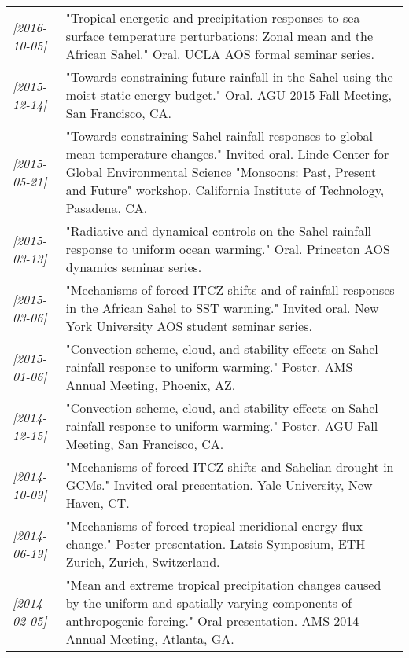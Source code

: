 \documentclass[12pt,letterpaper]{shillcv}
\begin{document}
\begin{center}
\begin{tabularx}{\textwidth}{lX}
\textit{[2016-10-05]} & "Tropical energetic and precipitation responses to sea surface temperature perturbations: Zonal mean and the African Sahel."  Oral.  UCLA AOS formal seminar series.\\
\textit{[2015-12-14]} & "Towards constraining future rainfall in the Sahel using the moist static energy budget." Oral.  AGU 2015 Fall Meeting, San Francisco, CA.\\
\textit{[2015-05-21]} & "Towards constraining Sahel rainfall responses to global mean temperature changes."  Invited oral.  Linde Center for Global Environmental Science "Monsoons: Past, Present and Future" workshop, California Institute of Technology, Pasadena, CA.\\
\textit{[2015-03-13]} & "Radiative and dynamical controls on the Sahel rainfall response to uniform ocean warming."  Oral.  Princeton AOS dynamics seminar series.\\
\textit{[2015-03-06]} & "Mechanisms of forced ITCZ shifts and of rainfall responses in the African Sahel to SST warming."  Invited oral.  New York University AOS student seminar series.\\
\textit{[2015-01-06]} & "Convection scheme, cloud, and stability effects on Sahel rainfall response to uniform warming."  Poster.  AMS Annual Meeting, Phoenix, AZ.\\
\textit{[2014-12-15]} & "Convection scheme, cloud, and stability effects on Sahel rainfall response to uniform warming."  Poster.  AGU Fall Meeting, San Francisco, CA.\\
\textit{[2014-10-09]} & "Mechanisms of forced ITCZ shifts and Sahelian drought in GCMs."  Invited oral presentation.  Yale University, New Haven, CT.\\
\textit{[2014-06-19]} & "Mechanisms of forced tropical meridional energy flux change."  Poster presentation.  Latsis Symposium, ETH Zurich, Zurich, Switzerland.\\
\textit{[2014-02-05]} & "Mean and extreme tropical precipitation changes caused by the uniform and spatially varying components of anthropogenic forcing."  Oral presentation.  AMS 2014 Annual Meeting, Atlanta, GA.\\
\end{tabularx}
\end{center}
\end{document}
